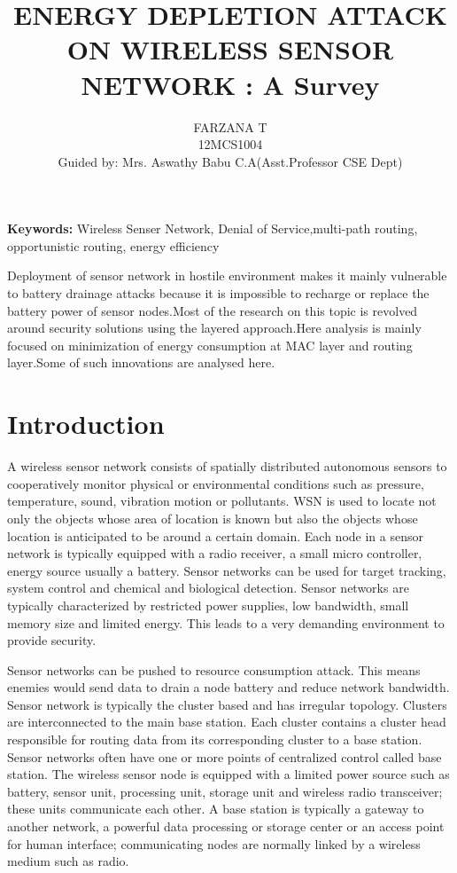 \documentclass[twocolumn,10pt]{article}
\title{ENERGY DEPLETION ATTACK ON WIRELESS SENSOR NETWORK : A Survey}
\author{FARZANA T\\12MCS1004\\Guided by: Mrs. Aswathy Babu C.A(Asst.Professor CSE Dept)}
\begin{document}
	
\maketitle
	
{\bf Keywords:}
Wireless Senser Network, Denial of Service,multi-path routing, opportunistic routing, energy efficiency

\abstract{} Deployment of sensor network in hostile environment makes it mainly vulnerable to battery drainage attacks because it is impossible to recharge or replace the battery power of sensor nodes.Most of the research on this topic is revolved around security  solutions using the layered approach.Here analysis is mainly focused on minimization of energy consumption at MAC layer and routing layer.Some of such innovations are analysed here.

\section{\label{reflabel} Introduction}

A wireless sensor network consists of spatially distributed  autonomous sensors to cooperatively monitor physical or  environmental conditions such as pressure, temperature,  sound, vibration motion or pollutants. WSN is used to locate  not only the objects whose area of location is known but also  the objects whose location is anticipated to be around a  certain domain. Each node in a sensor network is typically  equipped with a radio receiver, a small micro controller,  energy source usually a battery. Sensor networks can be used  for target tracking, system control and chemical and  biological detection. Sensor networks are typically  characterized by restricted power supplies, low bandwidth,  small memory size and limited energy.  This leads to a very  demanding environment to provide security.

Sensor networks  can  be pushed to resource consumption attack. This  means enemies would send data to drain a node battery and  reduce network bandwidth. Sensor network is typically the cluster based  and has irregular topology. Clusters are interconnected to the  main base station. Each cluster contains a cluster head  responsible for routing data from its corresponding cluster to  a base station. Sensor networks often have one or more points  of centralized control called base station. The wireless sensor  node is equipped with a limited power source such as battery,  sensor unit, processing unit, storage unit and wireless radio  transceiver; these units communicate each other. A base  station is typically a gateway to another network, a powerful  data processing or storage center or an access point for  human interface; communicating nodes are normally linked  by a wireless medium such as radio. 
\end{document}
